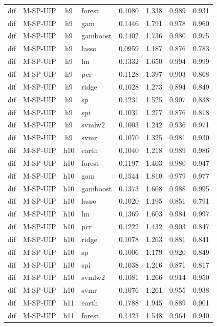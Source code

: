 \begin{ThreePartTable}
\begin{longtable}[t]{llclcccc}
dif & M-SP-UIP & h9 & forest & 0.1080 & 1.338 & 0.989 & 0.931\\
dif & M-SP-UIP & h9 & gam & 0.1446 & 1.791 & 0.978 & 0.960\\
dif & M-SP-UIP & h9 & gamboost & 0.1402 & 1.736 & 0.980 & 0.975\\
dif & M-SP-UIP & h9 & lasso & 0.0959 & 1.187 & 0.876 & 0.783\\
dif & M-SP-UIP & h9 & lm & 0.1332 & 1.650 & 0.994 & 0.999\\
dif & M-SP-UIP & h9 & pcr & 0.1128 & 1.397 & 0.903 & 0.868\\
dif & M-SP-UIP & h9 & ridge & 0.1028 & 1.273 & 0.894 & 0.849\\
dif & M-SP-UIP & h9 & sp & 0.1231 & 1.525 & 0.907 & 0.838\\
dif & M-SP-UIP & h9 & spi & 0.1031 & 1.277 & 0.876 & 0.818\\
dif & M-SP-UIP & h9 & svmlw2 & 0.1003 & 1.242 & 0.936 & 0.971\\
dif & M-SP-UIP & h9 & svmr & 0.1070 & 1.325 & 0.981 & 0.930\\
\addlinespace
dif & M-SP-UIP & h10 & earth & 0.1040 & 1.218 & 0.989 & 0.986\\
dif & M-SP-UIP & h10 & forest & 0.1197 & 1.403 & 0.980 & 0.947\\
dif & M-SP-UIP & h10 & gam & 0.1544 & 1.810 & 0.979 & 0.977\\
dif & M-SP-UIP & h10 & gamboost & 0.1373 & 1.608 & 0.988 & 0.995\\
dif & M-SP-UIP & h10 & lasso & 0.1020 & 1.195 & 0.851 & 0.791\\
dif & M-SP-UIP & h10 & lm & 0.1369 & 1.603 & 0.984 & 0.997\\
dif & M-SP-UIP & h10 & pcr & 0.1222 & 1.432 & 0.903 & 0.847\\
dif & M-SP-UIP & h10 & ridge & 0.1078 & 1.263 & 0.881 & 0.841\\
dif & M-SP-UIP & h10 & sp & 0.1006 & 1.179 & 0.920 & 0.849\\
dif & M-SP-UIP & h10 & spi & 0.1038 & 1.216 & 0.871 & 0.817\\
dif & M-SP-UIP & h10 & svmlw2 & 0.1081 & 1.266 & 0.914 & 0.950\\
dif & M-SP-UIP & h10 & svmr & 0.1076 & 1.261 & 0.955 & 0.938\\
\addlinespace
dif & M-SP-UIP & h11 & earth & 0.1788 & 1.945 & 0.889 & 0.901\\
dif & M-SP-UIP & h11 & forest & 0.1423 & 1.548 & 0.964 & 0.940\\

\end{longtable}
\end{ThreePartTable}
